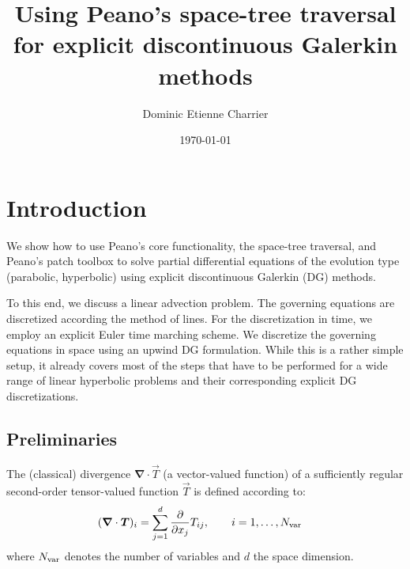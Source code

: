 \documentclass{scrreprt}
\begin{document}
\title{Using Peano's space-tree traversal for explicit
discontinuous Galerkin methods}
\author{Dominic Etienne Charrier}
\date{\today}
\maketitle
\chapter{Introduction}
We show how to use Peano's core functionality, the space-tree traversal, 
and Peano's patch toolbox to solve partial differential 
equations of the evolution type (parabolic, hyperbolic) using   
explicit discontinuous Galerkin (DG) methods.

To this end, we discuss a linear advection problem.
The governing equations are discretized according
the method of lines. For the discretization in time, we employ an explicit
Euler time marching scheme.
We discretize the governing equations in space using an upwind DG formulation.
While this is a rather simple setup, it already covers most of the
steps that have to be performed for a wide range of linear
hyperbolic problems and their corresponding explicit DG discretizations.
\section{Preliminaries}
The (classical) divergence $\boldsymbol{\nabla}\cdot\vec{T}$ (a vector-valued
function) of a sufficiently regular second-order tensor-valued function
$\vec{T}$ is defined according to:
\begin{align}
(\boldsymbol{\nabla}\cdot\vec{T})_{i} &= \sum_{j=1}^d
\frac{\partial}{\partial x_j} T_{ij},\qquad
i=1,\ldots,N_{\textup{var}}
\end{align}
where $N_\textup{var}$ denotes the number of variables
and $d$ the space dimension.

% 
\end{document}
